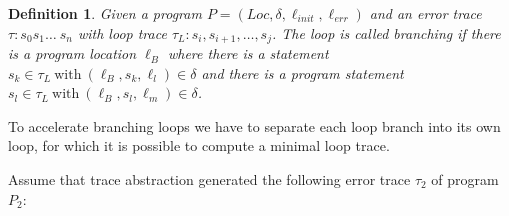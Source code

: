\documentclass{article}
\newcommand{\Loc}{\ensuremath{\mathit{Loc}}\xspace}
\newcommand{\err}{\ensuremath{\mathit{err}}\xspace}
\newcommand{\init}{\ensuremath{\mathit{init}}\xspace}
\newcommand{\loc}[1]{\ensuremath{\ell_{#1}}\xspace}
\newtheorem{mydef}{Definition}
\newcommand\mycom[1]{}
\newcommand\mycom[1]{#1}
\newcommand{\dd}[1]{\mycom{\todo[color=orange!40,inline]{\small DD: #1}}}
\newcommand{\ts}[1]{\mycom{\todo[color=green!40,inline]{\small TS: #1}}}
\begin{document}
\begin{mydef}
	Given a
	program $P = (\Loc, \delta, \ell_\init, \ell_\err)$ and an
	error trace $\tau: s_0s_1\ldots\ s_n$ with
	loop trace $\tau_L: s_i, s_{i+1}, \ldots, s_j$.
	The loop is called branching if there is a program location $\loc{B}$
	where there is a statement $s_k \in \tau_L\ \text{with}\ (\loc{B}, s_k, \loc{l}) \in \delta$
	and there is a program statement $s_l \in \tau_L\  \text{with}\ (\loc{B}, s_l, \loc{m}) \in \delta$.
\end{mydef}
\dd{Makes no real sense, because the definition does not talk about a ``loop''}
To accelerate branching loops we have to separate each loop branch into its own loop, for which it is possible to compute a minimal loop trace.



Assume that trace abstraction generated the following error trace $\tau_2$ of program $P_2$:
\begin{figure}[H]
	\begin{center}
		
	\end{center}
\end{figure}
\dd{Note that this is not a trace -- a trace is a statement sequence}
\dd{When you use pictures or tables as text elements, they should not be floating figures and should not have their own captions. For traces, this is sometimes (usually?) appropriate}
\end{document}

